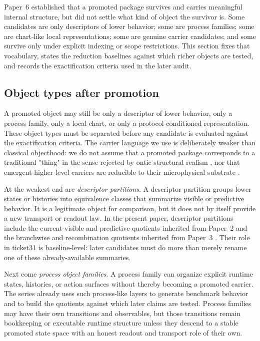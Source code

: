 \documentclass[11pt]{article}
\theoremstyle{definition}
\begin{document}
Paper~6 established that a promoted package survives and carries meaningful internal
structure, but did not settle what kind of object the survivor is. Some candidates are
only descriptors of lower behavior; some are process families; some are chart-like
local representations; some are genuine carrier candidates; and some survive only under
explicit indexing or scope restrictions. This section fixes that vocabulary, states the
reduction baselines against which richer objects are tested, and records the
exactification criteria used in the later audit.

\subsection{Object types after promotion}

A promoted object may still be only a descriptor of lower behavior, only a process
family, only a local chart, or only a protocol-conditioned representation. These
object types must be separated before any candidate is evaluated against the
exactification criteria. The carrier language we use is deliberately weaker than
classical objecthood: we do not assume that a promoted package corresponds to a
traditional "thing" in the sense rejected by ontic structural realism
\citep{LadymanRoss2007}, nor that emergent higher-level carriers are reducible to
their microphysical substrate \citep{Anderson1972}.

At the weakest end are \emph{descriptor partitions}. A descriptor partition groups lower
states or histories into equivalence classes that summarize visible or predictive
behavior. It is a legitimate object for comparison, but it does not by itself provide a
new transport or readout law. In the present paper, descriptor partitions include the
current-visible and predictive quotients inherited from Paper~2 and the branchwise and
recombination quotients inherited from Paper~3
\citep{Tsiokos2026HolonomyMemory,Tsiokos2026MarkingErasureRecombination}. Their role in
ticket31 is baseline-level: later candidates must do more than merely rename one of
these already-available summaries.

Next come \emph{process object families}. A process family can organize explicit runtime
states, histories, or action surfaces without thereby becoming a promoted carrier. The
series already uses such process-like layers to generate benchmark behavior and to build
the quotients against which later claims are tested. Process families may have their own
transitions and observables, but those transitions remain bookkeeping or executable
runtime structure unless they descend to a stable promoted state space with an honest
readout and transport role of their own.
\end{document}
